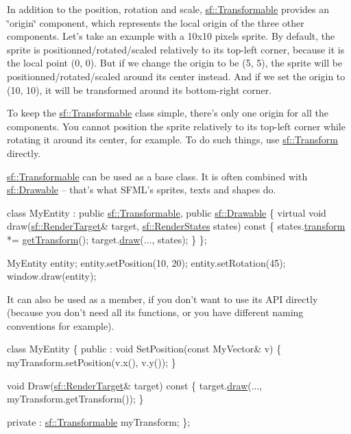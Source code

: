In addition to the position, rotation and scale, \hyperlink{classsf_1_1_transformable}{sf\-::\-Transformable} provides an \char`\"{}origin\char`\"{} component, which represents the local origin of the three other components. Let's take an example with a 10x10 pixels sprite. By default, the sprite is positionned/rotated/scaled relatively to its top-\/left corner, because it is the local point (0, 0). But if we change the origin to be (5, 5), the sprite will be positionned/rotated/scaled around its center instead. And if we set the origin to (10, 10), it will be transformed around its bottom-\/right corner.

To keep the \hyperlink{classsf_1_1_transformable}{sf\-::\-Transformable} class simple, there's only one origin for all the components. You cannot position the sprite relatively to its top-\/left corner while rotating it around its center, for example. To do such things, use \hyperlink{classsf_1_1_transform}{sf\-::\-Transform} directly.

\hyperlink{classsf_1_1_transformable}{sf\-::\-Transformable} can be used as a base class. It is often combined with \hyperlink{classsf_1_1_drawable}{sf\-::\-Drawable} -- that's what S\-F\-M\-L's sprites, texts and shapes do. 
\begin{DoxyCode}
\textcolor{keyword}{class }MyEntity : \textcolor{keyword}{public} \hyperlink{classsf_1_1_transformable}{sf::Transformable}, \textcolor{keyword}{public} \hyperlink{classsf_1_1_drawable}{sf::Drawable}
\{
    \textcolor{keyword}{virtual} \textcolor{keywordtype}{void} draw(\hyperlink{classsf_1_1_render_target}{sf::RenderTarget}& target, \hyperlink{classsf_1_1_render_states}{sf::RenderStates} states)\textcolor{keyword}{
       const}
\textcolor{keyword}{    }\{
        states.\hyperlink{classsf_1_1_render_states_a1f737981a0f2f0d4bb8dac866a8d1149}{transform} *= \hyperlink{classsf_1_1_transformable_a3b48c3362e3e2c14fef7551252deb7bb}{getTransform}();
        target.\hyperlink{classsf_1_1_render_target_a12417a3bcc245c41d957b29583556f39}{draw}(..., states);
    \}
\};

MyEntity entity;
entity.setPosition(10, 20);
entity.setRotation(45);
window.draw(entity);
\end{DoxyCode}


It can also be used as a member, if you don't want to use its A\-P\-I directly (because you don't need all its functions, or you have different naming conventions for example). 
\begin{DoxyCode}
\textcolor{keyword}{class }MyEntity
\{
\textcolor{keyword}{public} :
    \textcolor{keywordtype}{void} SetPosition(\textcolor{keyword}{const} MyVector& v)
    \{
        myTransform.setPosition(v.x(), v.y());
    \}

    \textcolor{keywordtype}{void} Draw(\hyperlink{classsf_1_1_render_target}{sf::RenderTarget}& target)\textcolor{keyword}{ const}
\textcolor{keyword}{    }\{
        target.\hyperlink{classsf_1_1_render_target_a12417a3bcc245c41d957b29583556f39}{draw}(..., myTransform.getTransform());
    \}

\textcolor{keyword}{private} :
    \hyperlink{classsf_1_1_transformable}{sf::Transformable} myTransform;
\};
\end{DoxyCode}


